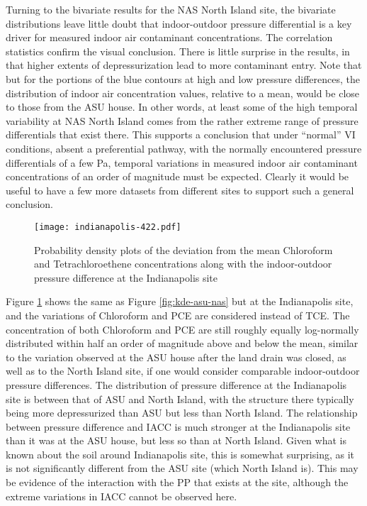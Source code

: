 \documentclass[journal=esthag,manuscript=article]{achemso}
\begin{document}
Turning to the bivariate results for the NAS North Island site, the bivariate distributions leave little doubt that indoor-outdoor pressure differential is a key driver for measured indoor air contaminant concentrations.
The correlation statistics confirm the visual conclusion.
There is little surprise in the results, in that higher extents of depressurization lead to more contaminant entry.
Note that but for the portions of the blue contours at high and low pressure differences, the distribution of indoor air concentration values, relative to a mean, would be close to those from the ASU house.
In other words, at least some of the high temporal variability at NAS North Island comes from the rather extreme range of pressure differentials that exist there.
This supports a conclusion that under “normal” VI conditions, absent a preferential pathway, with the normally encountered pressure differentials of a few Pa, temporal variations in measured indoor air contaminant concentrations of an order of magnitude must be expected.
Clearly it would be useful to have a few more datasets from different sites to support such a general conclusion.

\begin{figure}[htb!]
  \caption{Probability density plots of the deviation from the mean Chloroform and Tetrachloroethene concentrations along with the indoor-outdoor pressure difference at the Indianapolis site}
  \label{fig:kde-indianapolis}
  \texttt{[image: indianapolis-422.pdf]}
\end{figure}

Figure \ref{fig:kde-indianapolis} shows the same as Figure \ref{fig:kde-asu-nas} but at the Indianapolis site, and the variations of Chloroform and PCE are considered instead of TCE.
The concentration of both Chloroform and PCE are still roughly equally log-normally distributed within half an order of magnitude above and below the mean, similar to the variation observed at the ASU house after the land drain was closed, as well as to the North Island site, if one would consider comparable indoor-outdoor pressure differences.
The distribution of pressure difference at the Indianapolis site is between that of ASU and North Island, with the structure there typically being more depressurized than ASU but less than North Island.
The relationship between pressure difference and IACC is much stronger at the Indianapolis site than it was at the ASU house, but less so than at North Island.
Given what is known about the soil around Indianapolis site, this is somewhat surprising, as it is not significantly different from the ASU site (which North Island is).
This may be evidence of the interaction with the PP that exists at the site, although the extreme variations in IACC cannot be observed here.
\end{document}
